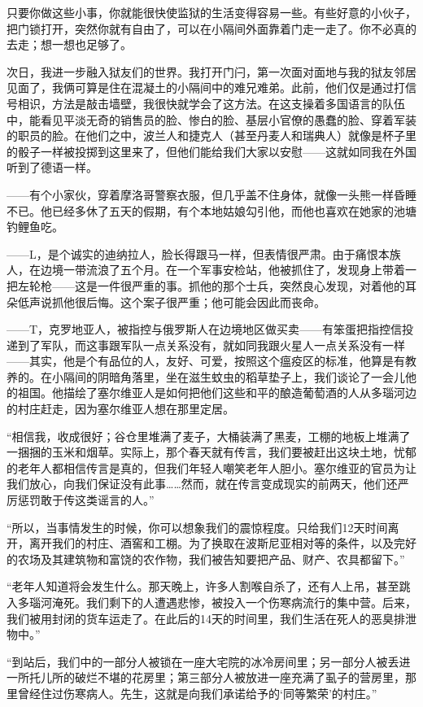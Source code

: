 \documentclass[UTF8]{ctexart}
\begin{document}
只要你做这些小事，你就能很快使监狱的生活变得容易一些。有些好意的小伙子，把门锁打开，突然你就有自由了，可以在小隔间外面靠着门走一走了。你不必真的去走；想一想也足够了。

次日，我进一步融入狱友们的世界。我打开门闩，第一次面对面地与我的狱友邻居见面了，我俩可算是住在混凝土的小隔间中的难兄难弟。此前，他们仅是通过打信号相识，方法是敲击墙壁，我很快就学会了这方法。在这支操着多国语言的队伍中，能看见平淡无奇的销售员的脸、惨白的脸、基层小官僚的愚蠢的脸、穿着军装的职员的脸。在他们之中，波兰人和捷克人（甚至丹麦人和瑞典人）就像是杯子里的骰子一样被投掷到这里来了，但他们能给我们大家以安慰——这就如同我在外国听到了德语一样。

——有个小家伙，穿着摩洛哥警察衣服，但几乎盖不住身体，就像一头熊一样昏睡不已。他已经多休了五天的假期，有个本地姑娘勾引他，而他也喜欢在她家的池塘钓鲤鱼吃。

——L，是个诚实的迪纳拉人，脸长得跟马一样，但表情很严肃。由于痛恨本族人，在边境一带流浪了五个月。在一个军事安检站，他被抓住了，发现身上带着一把左轮枪——这是一件很严重的事。抓他的那个士兵，突然良心发现，对着他的耳朵低声说抓他很后悔。这个案子很严重；他可能会因此而丧命。

——T，克罗地亚人，被指控与俄罗斯人在边境地区做买卖——有笨蛋把指控信投递到了军队，而这事跟军队一点关系没有，就如同我跟火星人一点关系没有一样——其实，他是个有品位的人，友好、可爱，按照这个瘟疫区的标准，他算是有教养的。在小隔间的阴暗角落里，坐在滋生蚊虫的稻草垫子上，我们谈论了一会儿他的祖国。他描绘了塞尔维亚人是如何把他们这些和平的酿造葡萄酒的人从多瑙河边的村庄赶走，因为塞尔维亚人想在那里定居。

“相信我，收成很好；谷仓里堆满了麦子，大桶装满了黑麦，工棚的地板上堆满了一捆捆的玉米和烟草。实际上，那个春天就有传言，我们要被赶出这块土地，忧郁的老年人都相信传言是真的，但我们年轻人嘲笑老年人胆小。塞尔维亚的官员为让我们放心，向我们保证没有此事……然而，就在传言变成现实的前两天，他们还严厉惩罚敢于传这类谣言的人。”

“所以，当事情发生的时候，你可以想象我们的震惊程度。只给我们12天时间离开，离开我们的村庄、酒窖和工棚。为了换取在波斯尼亚相对等的条件，以及完好的农场及其建筑物和富饶的农作物，我们被告知要把产品、财产、农具都留下。”

“老年人知道将会发生什么。那天晚上，许多人割喉自杀了，还有人上吊，甚至跳入多瑙河淹死。我们剩下的人遭遇悲惨，被投入一个伤寒病流行的集中营。后来，我们被用封闭的货车运走了。在此后的14天的时间里，我们生活在死人的恶臭排泄物中。”

“到站后，我们中的一部分人被锁在一座大宅院的冰冷房间里；另一部分人被丢进一所托儿所的破烂不堪的花房里；第三部分人被放进一座充满了虱子的营房里，那里曾经住过伤寒病人。先生，这就是向我们承诺给予的‘同等繁荣’的村庄。”
\end{document}
